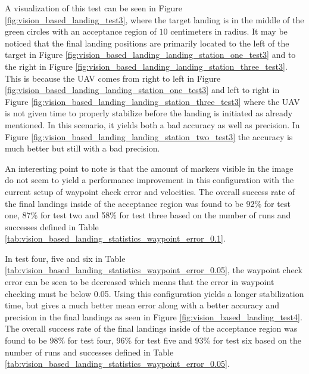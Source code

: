 \documentclass[../Head/report.tex]{subfiles}
\begin{document}
A visualization of this test can be seen in Figure \ref{fig:vision_based_landing_test3}, where the target landing is in the middle of the green circles with an acceptance region of $10$ centimeters in radius. It may be noticed that the final landing positions are primarily located to the left of the target in Figure \ref{fig:vision_based_landing_landing_station_one_test3} and to the right in Figure \ref{fig:vision_based_landing_landing_station_three_test3}. This is because the UAV comes from right to left in Figure \ref{fig:vision_based_landing_landing_station_one_test3} and left to right in Figure \ref{fig:vision_based_landing_landing_station_three_test3} where the UAV is not given time to properly stabilize before the landing is initiated as already mentioned. In this scenario, it yields both a bad accuracy as well as precision. In Figure \ref{fig:vision_based_landing_landing_station_two_test3} the accuracy is much better but still with a bad precision. 

An interesting point to note is that the amount of markers visible in the image do not seem to yield a performance improvement in this configuration with the current setup of waypoint check error and velocities. The overall success rate of the final landings inside of the acceptance region was found to be 92\% for test one, 87\% for test two and 58\% for test three based on the number of runs and successes defined in Table \ref{tab:vision_based_landing_statistics_waypoint_error_0.1}. 

In test four, five and six in Table \ref{tab:vision_based_landing_statistics_waypoint_error_0.05}, the waypoint check error can be seen to be decreased which means that the error in waypoint checking must be below 0.05. Using this configuration yields a longer stabilization time, but gives a much better mean error along with a better accuracy and precision in the final landings as seen in Figure \ref{fig:vision_based_landing_test4}. The overall success rate of the final landings inside of the acceptance region was found to be 98\% for test four, 96\% for test five and 93\% for test six based on the number of runs and successes defined in Table \ref{tab:vision_based_landing_statistics_waypoint_error_0.05}. 
\end{document}
